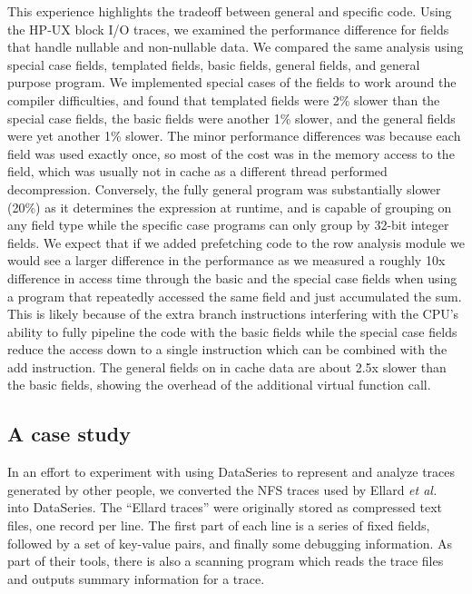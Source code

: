 \documentclass{acm_proc_article-sp}
\begin{document}
This experience highlights the tradeoff between general and specific
code.  
Using the HP-UX block I/O traces,
we examined the performance difference for fields
that handle nullable and non-nullable data. 
We
compared the same analysis using special case fields, templated
fields, basic fields, general fields, and general purpose program.  We
implemented special cases of the fields to work around the compiler
difficulties, and found that templated fields were 2\% slower than the
special case fields, the basic fields were another 1\% slower, and the
general fields were yet another 1\% slower.  The 
minor
performance differences
was because each field was used
exactly once, so most of the cost was in the memory access to the
field, which was usually not in cache as a different thread performed
decompression.  Conversely, the fully general program was
substantially slower (20\%) as it determines the expression at
runtime, and is capable of grouping on any field type while the
specific case programs can only group by 32-bit integer fields.  We
expect that if we added prefetching code to the row analysis module we
would see a larger difference in the performance as we measured a
roughly 10x difference in access time through the basic and the
special case fields when using a program that repeatedly accessed the
same field and just accumulated the sum.  This is likely because of
the extra branch instructions interfering with the CPU's ability to
fully pipeline the code with the basic fields while the special case
fields reduce the access down to a single instruction which can be
combined with the add instruction.  The general fields on in cache
data are about 2.5x slower than the basic fields, showing the overhead
of the additional virtual function call.

\subsection{A case study}\label{sec:ellard}

In an effort to experiment with using DataSeries to represent and
analyze traces generated by other people, we converted the NFS
traces used by Ellard \textit{et al.}~\cite{ellard03} into DataSeries.  
The ``Ellard traces''
were originally stored as compressed text files, one record per line.
The first part of each line is a series of fixed fields, followed by a
set of key-value pairs, and finally some debugging information.  As
part of their tools, there is also a scanning program which reads the
trace files and outputs summary information for a trace.
\end{document}
